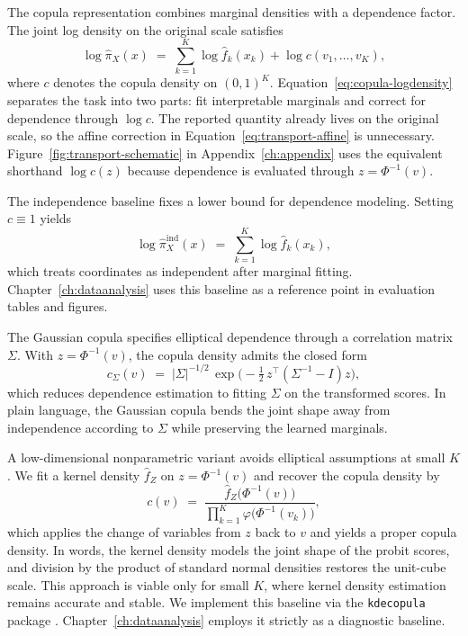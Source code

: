\documentclass[11pt,a4paper,twoside]{book}\usepackage[]{graphicx}\usepackage[]{xcolor}
\begin{document}
The copula representation combines marginal densities with a dependence factor. The joint log density on the original scale satisfies
\begin{equation}
  \log \widehat \pi_X(x) \;=\; \sum_{k=1}^{K} \log \widehat f_k(x_k) + \log c\!\left(v_1,\ldots,v_K\right),\label{eq:copula-logdensity}
\end{equation}
where $c$ denotes the copula density on $(0,1)^K$. Equation~\eqref{eq:copula-logdensity} separates the task into two parts: fit interpretable marginals and correct for dependence through $\log c$. The reported quantity already lives on the original scale, so the affine correction in Equation~\eqref{eq:transport-affine} is unnecessary. Figure~\ref{fig:transport-schematic} in Appendix~\ref{ch:appendix} uses the equivalent shorthand $\log c(z)$ because dependence is evaluated through $z=\Phi^{-1}(v)$.

The independence baseline fixes a lower bound for dependence modeling. Setting $c \equiv 1$ yields
\begin{equation}
  \log \widehat \pi_X^{\mathrm{ind}}(x) \;=\; \sum_{k=1}^{K} \log \widehat f_k(x_k),\label{eq:copula-independence}
\end{equation}
which treats coordinates as independent after marginal fitting. Chapter~\ref{ch:dataanalysis} uses this baseline as a reference point in evaluation tables and figures.

The Gaussian copula specifies elliptical dependence through a correlation matrix $\Sigma$. With $z=\Phi^{-1}(v)$, the copula density admits the closed form
\begin{equation}
  c_{\Sigma}(v) \;=\; |\Sigma|^{-1/2}\,\exp\!\Big(-\tfrac{1}{2}\,z^{\top}(\Sigma^{-1} - I)z\Big),\label{eq:copula-gaussian}
\end{equation}
which reduces dependence estimation to fitting $\Sigma$ on the transformed scores. In plain language, the Gaussian copula bends the joint shape away from independence according to $\Sigma$ while preserving the learned marginals.

A low-dimensional nonparametric variant avoids elliptical assumptions at small $K$. We fit a kernel density $\widehat f_Z$ on $z=\Phi^{-1}(v)$ and recover the copula density by
\begin{equation}
  c(v) \;=\; \frac{\widehat f_Z\!\big(\Phi^{-1}(v)\big)}{\prod_{k=1}^{K} \varphi\!\big(\Phi^{-1}(v_k)\big)},\label{eq:copula-kde}
\end{equation}
which applies the change of variables from $z$ back to $v$ and yields a proper copula density. In words, the kernel density models the joint shape of the probit scores, and division by the product of standard normal densities restores the unit-cube scale. This approach is viable only for small $K$, where kernel density estimation remains accurate and stable. We implement this baseline via the \texttt{kdecopula} package \citep{nagler2017kdecopula}. Chapter~\ref{ch:dataanalysis} employs it strictly as a diagnostic baseline.
\end{document}
